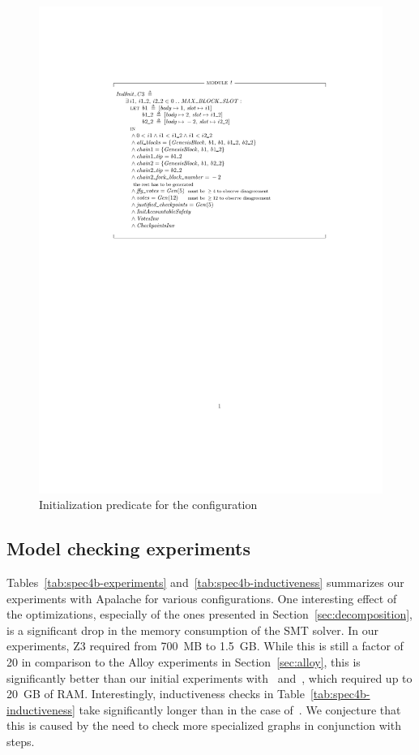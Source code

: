 \begin{figure}
    \includegraphics[width=\textwidth]{images/indinit-c3}
    \caption{Initialization predicate for the
             configuration~}\label{fig:indinit-c3}
\end{figure}

\subsection{Model checking experiments}

Tables~\ref{tab:spec4b-experiments} and~\ref{tab:spec4b-inductiveness}
summarizes our experiments with Apalache for various configurations. One
interesting effect of the optimizations, especially of the ones presented in
Section~\ref{sec:decomposition}, is a significant drop in the memory
consumption of the SMT solver. In our experiments, Z3 required from 700~MB to
1.5~GB\@. While this is still a factor of 20 in comparison to the Alloy
experiments in Section~\ref{sec:alloy}, this is significantly better than our
initial experiments with~\SpecTwo{} and~\SpecThree{}, which required up to
20~GB of RAM\@. Interestingly, inductiveness checks in
Table~\ref{tab:spec4b-inductiveness} take significantly longer than in the case
of~\SpecFour{}. We conjecture that this is caused by the need to check more
specialized graphs in conjunction with steps.

